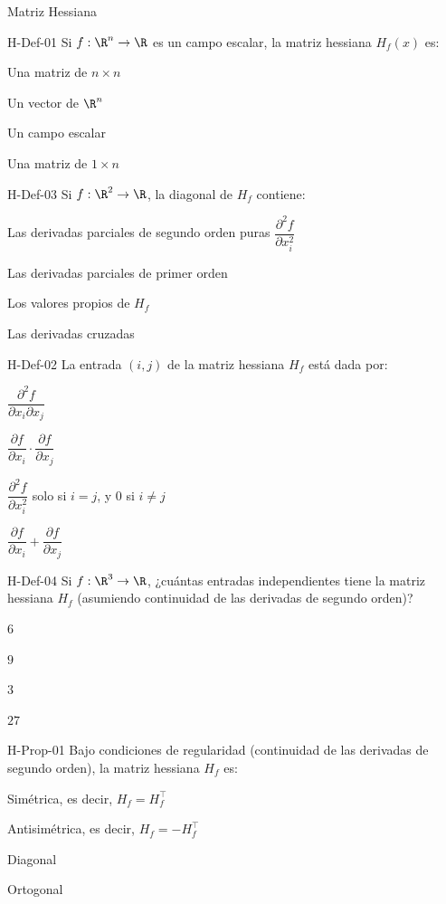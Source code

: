 \documentclass[a4,11pt]{aleph-notas}
\begin{document}
\begin{quiz}{Matriz Hessiana}

\begin{multi}[]%
    {H-Def-01}
    Si $f:\R^n\to\R$ es un campo escalar, la matriz hessiana $H_f({x})$ es:
    \item* Una matriz de $n\times n$
    \item Un vector de $\R^n$
    \item Un campo escalar
    \item Una matriz de $1\times n$
\end{multi}

\begin{multi}[]%
    {H-Def-03}
    Si $f:\R^2\to\R$, la diagonal de $H_f$ contiene:
    \item* Las derivadas parciales de segundo orden puras $\dfrac{\partial^2 f}{\partial x_i^2}$
    \item Las derivadas parciales de primer orden
    \item Los valores propios de $H_f$
    \item Las derivadas cruzadas
\end{multi}

\begin{multi}[]%
    {H-Def-02}
    La entrada $(i,j)$ de la matriz hessiana $H_f$ está dada por:
    \item* $\dfrac{\partial^2 f}{\partial x_i \partial x_j}$
    \item $\dfrac{\partial f}{\partial x_i} \cdot \dfrac{\partial f}{\partial x_j}$
    \item $\dfrac{\partial^2 f}{\partial x_i^2}$ solo si $i=j$, y $0$ si $i\neq j$
    \item $\dfrac{\partial f}{\partial x_i} + \dfrac{\partial f}{\partial x_j}$
\end{multi}

\begin{multi}[]%
    {H-Def-04}
    Si $f:\R^3\to\R$, ¿cuántas entradas independientes tiene la matriz hessiana $H_f$ (asumiendo continuidad de las derivadas de segundo orden)?
    \item* $6$
    \item $9$
    \item $3$
    \item $27$
\end{multi}

\begin{multi}[]%
    {H-Prop-01}
    Bajo condiciones de regularidad (continuidad de las derivadas de segundo orden), la matriz hessiana $H_f$ es:
    \item* Simétrica, es decir, $H_f = H_f^\top$
    \item Antisimétrica, es decir, $H_f = -H_f^\top$
    \item Diagonal
    \item Ortogonal
\end{multi}


\end{quiz}
\end{document}
